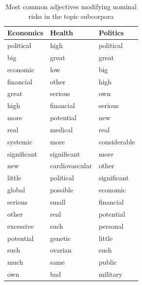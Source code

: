              \begin{table}[htb!]
             \centering
             \small
             \begin{tabular}{|l|l|l|}
                          \hline
                          \textbf{Economics}   & \textbf{Health}         & \textbf{Politics}     \\ \hline
                          political   & high           & political    \\ \hline
                          big         & great          & great        \\ \hline
                          economic    & low            & big          \\ \hline
                          financial   & other          & high         \\ \hline
                          great       & serious        & own          \\ \hline
                          high        & financial      & serious      \\ \hline
                          more        & potential      & new          \\ \hline
                          real        & medical        & real         \\ \hline
                          systemic    & more           & considerable \\ \hline
                          significant & significant    & more         \\ \hline
                          new         & cardiovascular & other        \\ \hline
                          little      & political      & significant  \\ \hline
                          global      & possible       & economic     \\ \hline
                          serious     & small          & financial    \\ \hline
                          other       & real           & potential    \\ \hline
                          excessive   & such           & personal     \\ \hline
                          potential   & genetic        & little       \\ \hline
                          such        & ovarian        & such         \\ \hline
                          much        & same           & public       \\ \hline
                          own         & bad            & military     \\ \hline
                          \end{tabular}
                          \caption{Most common adjectives modifying nominal risks in the topic subcorpora}
                          \label{tab:echepo_adjmod}
             \end{table}


